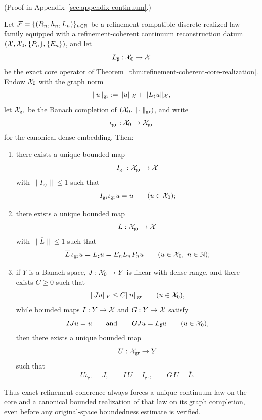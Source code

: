 (Proof in Appendix~\ref{sec:appendix-continuum}.)

\begin{theorem}
\label{thm:exact-core-graph-completion}
Let \(\mathcal F=\{(R_n,h_n,L_n)\}_{n\in\mathbb{N}}\) be a refinement-compatible
discrete realized law family equipped with a refinement-coherent continuum
reconstruction datum \((\mathcal{X},\mathcal{X}_0,\{P_n\},\{E_n\})\), and let
\[
L_\sharp:\mathcal{X}_0\to\mathcal{X}
\]
be the exact core operator of
Theorem~\ref{thm:refinement-coherent-core-realization}. Endow \(\mathcal{X}_0\) with
the graph norm
\[
\|u\|_{\mathrm{gr}}
:=
\|u\|_{\mathcal{X}}+\|L_\sharp u\|_{\mathcal{X}},
\]
let \(\mathcal{X}_{\mathrm{gr}}\) be the Banach completion of
\((\mathcal{X}_0,\|\cdot\|_{\mathrm{gr}})\), and write
\[
\iota_{\mathrm{gr}}:\mathcal{X}_0\to\mathcal{X}_{\mathrm{gr}}
\]
for the canonical dense embedding. Then:
\begin{enumerate}[label=(\roman*), leftmargin=2em, itemsep=0.2em]
\item there exists a unique bounded map
      \[
      I_{\mathrm{gr}}:\mathcal{X}_{\mathrm{gr}}\to\mathcal{X}
      \]
      with \(\|I_{\mathrm{gr}}\|\le 1\) such that
      \[
      I_{\mathrm{gr}}\iota_{\mathrm{gr}}u=u
      \qquad (u\in\mathcal{X}_0);
      \]
\item there exists a unique bounded map
      \[
      \overline L:\mathcal{X}_{\mathrm{gr}}\to\mathcal{X}
      \]
      with \(\|\overline L\|\le 1\) such that
      \[
      \overline L\,\iota_{\mathrm{gr}}u=L_\sharp u=E_nL_nP_nu
      \qquad (u\in\mathcal{X}_0,\ n\in\mathbb{N});
      \]
\item if \(Y\) is a Banach space, \(J:\mathcal{X}_0\to Y\) is linear with dense
      range, and there exists \(C\ge 0\) such that
      \[
      \|Ju\|_Y\le C\|u\|_{\mathrm{gr}}
      \qquad (u\in\mathcal{X}_0),
      \]
      while bounded maps \(I:Y\to\mathcal{X}\) and \(G:Y\to\mathcal{X}\) satisfy
      \[
      IJu=u
      \qquad\text{and}\qquad
      GJu=L_\sharp u
      \qquad (u\in\mathcal{X}_0),
      \]
      then there exists a unique bounded map
      \[
      U:\mathcal{X}_{\mathrm{gr}}\to Y
      \]
      such that
      \[
      U\iota_{\mathrm{gr}}=J,
      \qquad
      I\,U=I_{\mathrm{gr}},
      \qquad
      G\,U=\overline L.
      \]
\end{enumerate}
Thus exact refinement coherence always forces a unique continuum law on the
core and a canonical bounded realization of that law on its graph completion,
even before any original-space boundedness estimate is verified.
\end{theorem}


